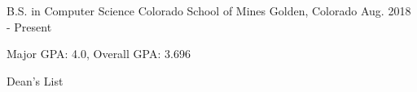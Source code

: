 


\begin{cventries}

  \cventry
    {B.S. in Computer Science} %
    {Colorado School of Mines} %
    {Golden, Colorado} %
    {Aug. 2018 - Present} %
    {
      \begin{cvitems} %
        \item{Major GPA: 4.0, Overall GPA: 3.696}
        \item{Dean's List}
      \end{cvitems}
    }

\end{cventries}
